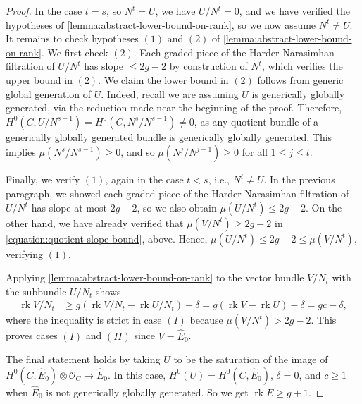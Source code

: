 \documentclass[12 pt]{amsart}
\theoremstyle{plain}
\theoremstyle{definition}
\theoremstyle{remark}
\numberwithin{equation}{section}
\DeclareMathOperator\rk{rk}
\begin{document}
\begin{proof}
	In the case $t = s$, so $N^t = U$, we have $U/N^t = 0$, and we have verified the hypotheses of
	\autoref{lemma:abstract-lower-bound-on-rank},
	so we now assume $N^t \neq U$.
	It remains to check hypotheses $(1)$ and $(2)$ of 
	\autoref{lemma:abstract-lower-bound-on-rank}.
	We first check $(2)$. Each 
	graded piece of the Harder-Narasimhan filtration of $U/N^t$
	has slope $\leq 2g - 2$ by construction of $N^t$, which verifies
	the upper bound in $(2)$.
	We claim the lower bound in $(2)$ follows from generic global generation of $U$.
	Indeed, recall we are assuming $U$ is generically globally generated, via
	the reduction made near the beginning of the proof.
	Therefore, 
	$H^0(C, U/N^{s-1})
	= H^0(C, N^s/N^{s-1}) \neq 0$,
	as any quotient bundle of a generically globally generated bundle is
	generically globally generated.
	This implies $\mu(N^s/N^{s-1}) \geq 0$, and so $\mu(N^j/N^{j-1}) \geq 0$ for
	all $1 \leq j \leq t$.

	Finally, we verify $(1)$, again in the case $t< s$, i.e., $N^t \neq U$.
	In the previous paragraph, we showed each graded piece of the
	Harder-Narasimhan filtration of $U/N^t$ has slope at most $2g -2$, so
	we also obtain $\mu(U/N^t) \leq 2g - 2$.
	On the other hand, we have already verified that $\mu(V/N^t) \geq 2g-2$ 
	in \eqref{equation:quotient-slope-bound}, above.
	Hence,
	$\mu(U/N^t) \leq 2g-2 \leq \mu(V/N^t)$,	
	verifying $(1)$.

	Applying \autoref{lemma:abstract-lower-bound-on-rank} to the vector bundle
	$V/N_t$ with the subbundle $U/N_t$ shows 
	\begin{align*}
	    \rk V/N_t &\geq g(\rk V/N_t -
	\rk U/N_t) - \delta
	= g(\rk V -
	\rk U)-\delta
	=gc - \delta,
	\end{align*}
	where the inequality is strict in case $(I)$ because $\mu(V/N^t) > 2g -
	2$.
	This proves cases $(I)$ and $(II)$ since $V = \widehat{E}_0$. 
	
	The final statement
	holds by taking $U$ to be the saturation of the image of
	$H^0(C, \widehat{E}_0) \otimes \mathscr O_C \to \widehat{E}_0$.
	In this case, $H^0(U) = H^0(C, \widehat{E}_0)$, $\delta = 0$,
	and $c \geq 1$
	when $\widehat{E}_0$ is not generically globally generated. So we get
	$\rk E \geq g + 1$.
\end{proof}
\end{document}
